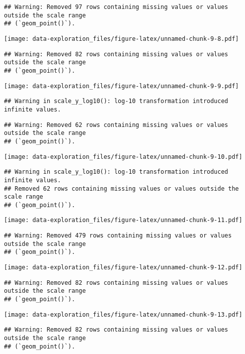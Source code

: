 \documentclass[
]{article}
\begin{document}
\begin{verbatim}
## Warning: Removed 97 rows containing missing values or values outside the scale range
## (`geom_point()`).
\end{verbatim}

\texttt{[image: data-exploration\_files/figure-latex/unnamed-chunk-9-8.pdf]}

\begin{verbatim}
## Warning: Removed 82 rows containing missing values or values outside the scale range
## (`geom_point()`).
\end{verbatim}

\texttt{[image: data-exploration\_files/figure-latex/unnamed-chunk-9-9.pdf]}

\begin{verbatim}
## Warning in scale_y_log10(): log-10 transformation introduced infinite values.
\end{verbatim}

\begin{verbatim}
## Warning: Removed 62 rows containing missing values or values outside the scale range
## (`geom_point()`).
\end{verbatim}

\texttt{[image: data-exploration\_files/figure-latex/unnamed-chunk-9-10.pdf]}

\begin{verbatim}
## Warning in scale_y_log10(): log-10 transformation introduced infinite values.
## Removed 62 rows containing missing values or values outside the scale range
## (`geom_point()`).
\end{verbatim}

\texttt{[image: data-exploration\_files/figure-latex/unnamed-chunk-9-11.pdf]}

\begin{verbatim}
## Warning: Removed 479 rows containing missing values or values outside the scale range
## (`geom_point()`).
\end{verbatim}

\texttt{[image: data-exploration\_files/figure-latex/unnamed-chunk-9-12.pdf]}

\begin{verbatim}
## Warning: Removed 82 rows containing missing values or values outside the scale range
## (`geom_point()`).
\end{verbatim}

\texttt{[image: data-exploration\_files/figure-latex/unnamed-chunk-9-13.pdf]}

\begin{verbatim}
## Warning: Removed 82 rows containing missing values or values outside the scale range
## (`geom_point()`).
\end{verbatim}
\end{document}
